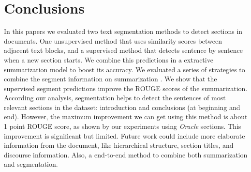 \documentclass[sigconf]{acmart}
\begin{document}
\section{Conclusions}\label{sec:conclu}
In this papers we evaluated two text segmentation methods to detect sections in documents. One unsupervised method that uses similarity scores between adjacent text blocks, and a supervised method that detects sentence by sentence when a new section starts. We combine this predictions in a extractive summarization model to boost its accuracy. We evaluated a series of strategies to combine the segment information on summarization . We show that the supervised segment predictions improve the ROUGE scores of the summarization. According our analysis, segmentation helps to detect  the sentences of most relevant sections in the dataset: introduction and conclusions (at beginning and end). However, the maximum improvement we can get using this method is about 1 point ROUGE score, as shown by our experiments using \emph{Oracle} sections. This improvement is significant but limited. Future work could include more elaborate information from the document, like hierarchical structure, section titles, and discourse information. Also, a end-to-end method to combine both summarization and segmentation.





\end{document}
